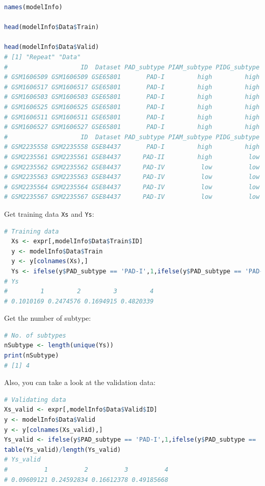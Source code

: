 \documentclass[
  12pt,
]{book}
\newcommand{\passthrough}[1]{#1}
\begin{document}
\begin{lstlisting}[language=R]
names(modelInfo)

head(modelInfo$Data$Train)

head(modelInfo$Data$Valid)
# [1] "Repeat" "Data"  
#                    ID  Dataset PAD_subtype PIAM_subtype PIDG_subtype platform
# GSM1606509 GSM1606509 GSE65801       PAD-I         high         high GPL14550
# GSM1606517 GSM1606517 GSE65801       PAD-I         high         high GPL14550
# GSM1606503 GSM1606503 GSE65801       PAD-I         high         high GPL14550
# GSM1606525 GSM1606525 GSE65801       PAD-I         high         high GPL14550
# GSM1606511 GSM1606511 GSE65801       PAD-I         high         high GPL14550
# GSM1606527 GSM1606527 GSE65801       PAD-I         high         high GPL14550
#                    ID  Dataset PAD_subtype PIAM_subtype PIDG_subtype platform
# GSM2235558 GSM2235558 GSE84437       PAD-I         high         high  GPL6947
# GSM2235561 GSM2235561 GSE84437      PAD-II         high          low  GPL6947
# GSM2235562 GSM2235562 GSE84437      PAD-IV          low          low  GPL6947
# GSM2235563 GSM2235563 GSE84437      PAD-IV          low          low  GPL6947
# GSM2235564 GSM2235564 GSE84437      PAD-IV          low          low  GPL6947
# GSM2235567 GSM2235567 GSE84437      PAD-IV          low          low  GPL6947
\end{lstlisting}

Get training data \passthrough{\lstinline!Xs!} and \passthrough{\lstinline!Ys!}:

\begin{lstlisting}[language=R]
  # Training data
  Xs <- expr[,modelInfo$Data$Train$ID]
  y <- modelInfo$Data$Train
  y <- y[colnames(Xs),]
  Ys <- ifelse(y$PAD_subtype == 'PAD-I',1,ifelse(y$PAD_subtype == 'PAD-II',2,ifelse(y$PAD_subtype == 'PAD-III',3,ifelse(y$PAD_subtype == 'PAD-IV',4,NA)))); table(Ys)/length(Ys)
# Ys
#         1         2         3         4 
# 0.1010169 0.2474576 0.1694915 0.4820339
\end{lstlisting}

Get the number of subtype:

\begin{lstlisting}[language=R]
# No. of subtypes
nSubtype <- length(unique(Ys))
print(nSubtype)
# [1] 4
\end{lstlisting}

Also, you can take a look at the validation data:

\begin{lstlisting}[language=R]
# Validating data
Xs_valid <- expr[,modelInfo$Data$Valid$ID]
y <- modelInfo$Data$Valid
y <- y[colnames(Xs_valid),]
Ys_valid <- ifelse(y$PAD_subtype == 'PAD-I',1,ifelse(y$PAD_subtype == 'PAD-II',2,ifelse(y$PAD_subtype == 'PAD-III',3,ifelse(y$PAD_subtype == 'PAD-IV',4,NA))))
table(Ys_valid)/length(Ys_valid)
# Ys_valid
#          1          2          3          4 
# 0.09609121 0.24592834 0.16612378 0.49185668
\end{lstlisting}
\end{document}
